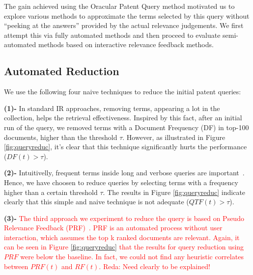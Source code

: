 The gain achieved using the Oracular Patent Query method motivated us to explore various methods to approximate the terms
selected by this query without ``peeking at the answers'' provided by
the actual relevance judgements.  We first attempt this via fully
automated methods and then proceed to evaluate semi-automated methods
based on interactive relevance feedback methods.

\subsection{Automated Reduction}
\label{sec:AutomatedReduction}
%
We use the following four naive techniques to reduce the initial patent queries: 

\noindent \textbf{(1)-} In standard IR approaches, removing terms, appearing a lot in the collection, helps the retrieval effectiveness. Inspired by this fact, after an initial run of the query, we removed terms  with a Document Frequency (DF) in top-100 documents, higher than the threshold $\tau$. However, as illustrated in Figure \ref{fig:queryreduc}, it's clear that this technique significantly hurts the performance ($DF(t)>\tau$).  

\noindent \textbf{(2)-} Intuitivelly, frequent terms inside long and verbose queries are  important~\cite{maxwell2013compact}. Hence, we have  choosen to reduce queries by selecting terms with a frequency higher than a certain threshold $\tau$. The results in Figure \ref{fig:queryreduc} indicate clearly that this simple and naive technique is not adequate ($QTF(t)>\tau$). 

\noindent \textbf{(3)-} \textcolor{red}{The third approach we experiment to reduce the query is based on Pseudo Relevance Feedback (PRF)~\cite{Baeza-Yates2011}. PRF is an automated process without user interaction, which assumes the top k ranked documents are relevant. Again, it can be seen in Figure \ref{fig:queryreduc} that the results for query reduction using $\mathit{PRF}$ were below the baseline. In fact, we could not find any heuristic correlates between  $ PRF(t)$ and $ RF(t)$. Reda: Need clearly to be explained!}

